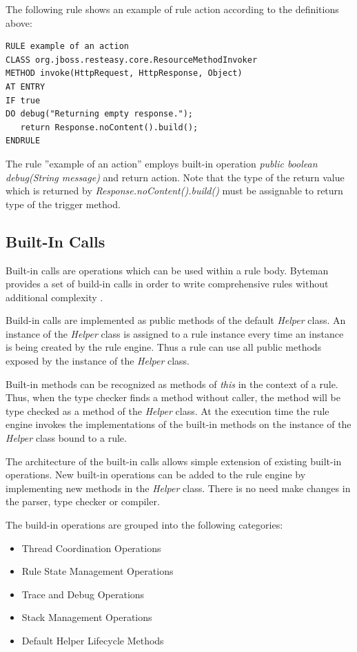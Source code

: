 \documentclass[12pt,oneside]{fithesis2}
\begin{document}
The following rule shows an example of rule action according to the definitions above:
\begin{lstlisting}[caption = Rule Action, label = rule_action_code]
RULE example of an action
CLASS org.jboss.resteasy.core.ResourceMethodInvoker
METHOD invoke(HttpRequest, HttpResponse, Object)
AT ENTRY
IF true
DO debug("Returning empty response.");
   return Response.noContent().build();
ENDRULE
\end{lstlisting}

The rule ''example of an action'' employs built-in operation \textit{public boolean debug(String message)}  and return action. Note that the type of the return value which is returned by \textit{Response.noContent().build()} must be assignable to return type of the trigger method.

\subsection{Built-In Calls}
Built-in calls are operations which can be used within a rule body. Byteman provides a set of build-in calls in order to write comprehensive rules without additional complexity \cite[Built-In Calls]{byteman_doc}.

Build-in calls are implemented as public methods of the default \textit{Helper} class. An instance of the \textit{Helper} class is assigned to a rule instance every time an instance is being created by the rule engine. Thus a rule can use all public methods exposed by the instance of the \textit{Helper} class.

Built-in methods can be recognized as methods of \textit{this} in the context of a rule. Thus, when the type checker finds a method without caller, the method will be type checked as a method of the \textit{Helper} class. At the execution time the rule engine invokes the implementations of the built-in methods on the instance of the \textit{Helper} class bound to a rule.

The architecture of the built-in calls allows simple extension of existing built-in operations. New built-in operations can be added to the rule engine by implementing new methods in the \textit{Helper} class. There is no need make changes in the parser,  type checker or compiler.

The build-in operations are grouped into the following categories\cite{byteman_doc}:
\begin{itemize}
	\item	Thread Coordination Operations
	\item	Rule State Management Operations
	\item	Trace and Debug Operations
	\item	Stack Management Operations
	\item	Default Helper Lifecycle Methods
\end{itemize}
 
\end{document}

